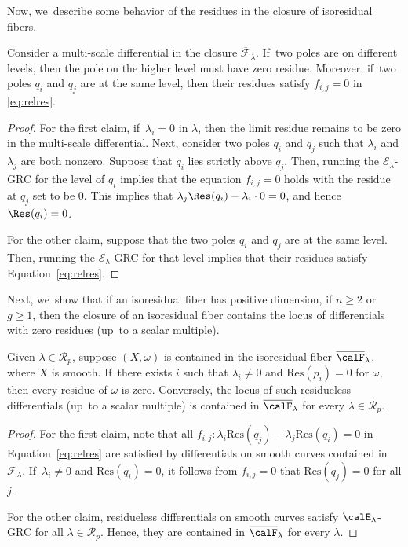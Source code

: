 Now, we~describe some behavior of the residues in the closure of isoresidual fibers.

\begin{cor}\label{cor:reszero}
Consider a multi-scale differential in the closure $\overline{\mathcal{F}}_{\lambda}$. If~two poles are on different levels, then the pole on the higher level must have zero residue. Moreover, if~two poles $q_i$ and $q_j$ are at the same level, then their residues satisfy $f_{i,j} = 0$ in \eqref{eq:relres}.
\end{cor}

\begin{proof}
For the first claim, if~$\lambda_i = 0$ in $\lambda$, then the limit residue remains to be zero in the multi-scale differential. Next,
consider two poles $q_{i}$ and $q_{j}$ such that $\lambda_{i}$ and $\lambda_{j}$ are both nonzero. Suppose that $q_{i}$ lies strictly above $q_{j}$.
Then, running the $\mathcal{E}_{\lambda}$-GRC for the level of $q_i$ implies that the equation $f_{i,j} = 0$ holds with the residue at $q_{j}$ set to be $0$. This implies that $\lambda_{j}\Res(q_{i})-\lambda_{i}\cdot 0=0$, and hence $\Res(q_{i})=0$.

For the other claim, suppose that the two poles $q_{i}$ and $q_{j}$ are at the same level. Then, running the $\mathcal{E}_{\lambda}$-GRC for that level implies that their residues satisfy Equation~\eqref{eq:relres}.
\end{proof}

Next, we~show that if an isoresidual fiber has positive dimension, \ie if $n\geq2$ or $g\geq1$, then the closure of an isoresidual fiber contains the locus of differentials with zero residues (up~to a scalar multiple).
\begin{cor}\label{cor:reszeros}
Given $\lambda\in \mathcal R_p$,
suppose $(X,\omega)$ is contained in the isoresidual fiber $\overline{\calF}_{\lambda}$, where $X$ is smooth. If~there exists $i$ such that $\lambda_i \neq 0$ and $\mathrm{Res}(p_i) =0$ for $\omega$,
then every residue of $\omega$ is zero. Conversely, the locus of such residueless differentials (up~to a scalar multiple) is contained in $\overline{\calF}_{\lambda}$ for every $\lambda\in \mathcal R_p$.
\end{cor}

\begin{proof}
For the first claim, note that all $f_{i,j}\colon\lambda_i \mathrm{Res}(q_j) - \lambda_j \mathrm{Res}(q_i)=0$ in Equation~\eqref{eq:relres} are satisfied by differentials on smooth curves contained in $\mathcal F_\lambda$. If~$\lambda_i \neq 0$ and $\mathrm{Res}(q_i)= 0$, it follows from $f_{i,j} = 0$ that $\mathrm{Res}(q_j)= 0$ for all $j$.

For the other claim, residueless differentials on smooth curves satisfy $\calE_{\lambda}$-GRC for all $\lambda \in \mathcal R_p$. Hence, they are contained in $\overline{\calF}_{\lambda}$ for every $\lambda$.
\end{proof}


